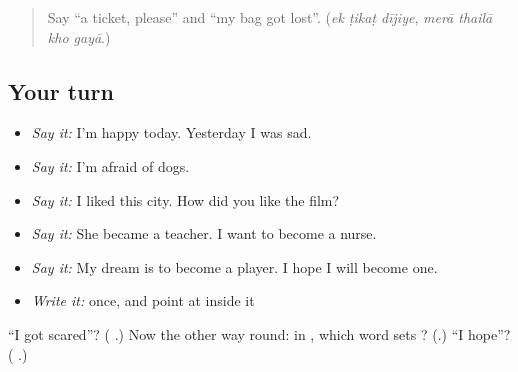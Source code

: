 \begin{quote}
Say \textquotedblleft{}a ticket, please\textquotedblright{} and \textquotedblleft{}my bag got lost\textquotedblright{}. (\emph{ek ṭikaṭ dījiye}, \emph{merā thailā kho gayā}.)
\end{quote}

\subsection*{Your turn}
\begin{itemize}
\raggedright
  \item \emph{Say it:} I'm happy today. Yesterday I was sad.
  \item \emph{Say it:} I'm afraid of dogs.
  \item \emph{Say it:} I liked this city. How did you like the film?
  \item \emph{Say it:} She became a teacher. I want to become a nurse.
  \item \emph{Say it:} My dream is to become a player. I hope I will become one.
  \item \emph{Write it:} \textbf{} once, and point at  inside it
\end{itemize}

\begin{tcolorbox}[breakable,colback=teal!4,colframe=teal!35!black,title={Before you move on}]
\textquotedblleft{}I got scared\textquotedblright{}? (\textbf{  }.) Now the other way round: in \textbf{    }, which word sets \textbf{ }? (\textbf{}.) \textquotedblleft{}I hope\textquotedblright{}? (\textbf{  }.)
\end{tcolorbox}
